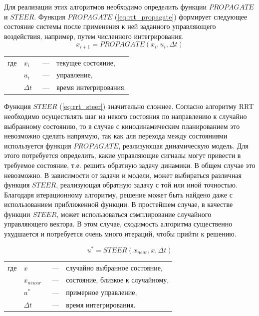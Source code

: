 Для реализации этих алгоритмов необходимо определить функции $PROPAGATE$ и $STEER$. Функция $PROPAGATE$
(\ref{eq:rrt_propagate}) формирует следующее состояние системы после применения к ней заданного управляющего
воздействия, например, путем численного интегрирования.
\begin{equation}
    \label{eq:rrt_propagate}
    x_{i+1} = PROPAGATE(x_i, u_i, \Delta t)
\end{equation}

\noindent\begin{tabularx}{\linewidth}{lllX}
    где & $x_i$      &~---& текущее состояние, \\
        & $u_i$      &~---& управление, \\
        & $\Delta t$ &~---& время интегрирования.
\end{tabularx}

Функция $STEER$ (\ref{eq:rrt_steer}) значительно сложнее. Согласно алгоритму RRT необходимо осуществлять шаг
из некого состояния по направлению к случайно выбранному состоянию, то в случае с кинодинамическим планированием
это невозможно сделать напрямую, так как для перехода между состояниями используется функция $PROPAGATE$, реализующая
динамическую модель. Для этого потребуется определить, какие управляющие сигналы могут привести в требуемое состояние,
т.е. решить обратную задачу динамики. В общем случае это невозможно. В зависимости от задачи и модели, может выбираться
различная функция $STEER$, реализующая обратную задачу с той или иной точностью. Благодаря итерационному алгоритму,
решение может быть найдено даже с использованием приближенной функции. В простейшем случае, в качестве функции
$STEER$, может использоваться сэмплирование случайного управляющего вектора. В этом случае, сходимость алгоритма
существенно ухудшается и потребуется очень много итераций, чтобы прийти к решению.

\begin{equation}
\label{eq:rrt_steer}
u^* = STEER(x_{near}, x, \Delta t)
\end{equation}

\noindent\begin{tabularx}{\linewidth}{lllX}
    где & $x$         &~---& случайно выбранное состояние, \\
        & $x_{newar}$ &~---& состояние, близкое к случайному, \\
        & $u^*$       &~---& примерное управление, \\
        & $\Delta t$  &~---& время интегрирования.
\end{tabularx}

